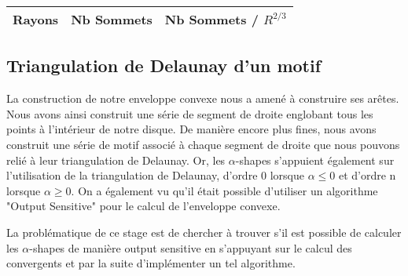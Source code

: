 \begin{tabular}{|l||c|c|}
\hline
Rayons & Nb Sommets & Nb Sommets / $R^{2/3}$\\
\hline

\hline
\end{tabular} 

\subsection{Triangulation de Delaunay d'un motif}


La construction de notre enveloppe convexe nous a amené à construire ses arêtes. Nous avons ainsi construit une série de segment de droite englobant tous les points à l'intérieur de notre disque. De manière encore plus fines, nous avons construit une série de motif associé à chaque segment de droite que nous pouvons relié à leur triangulation de Delaunay. Or, les $\alpha$-shapes s’appuient également sur l'utilisation de la triangulation de Delaunay, d'ordre 0 lorsque $\alpha \leq 0$ et d'ordre n lorsque $\alpha \geq 0$. On a également vu qu'il était possible d'utiliser un algorithme "Output Sensitive" pour le calcul de l'enveloppe convexe.

La problématique de ce stage est de chercher à trouver s'il est possible de calculer les $\alpha$-shapes de manière output sensitive en s'appuyant sur le calcul des convergents et par la suite d'implémenter un tel algorithme.  

